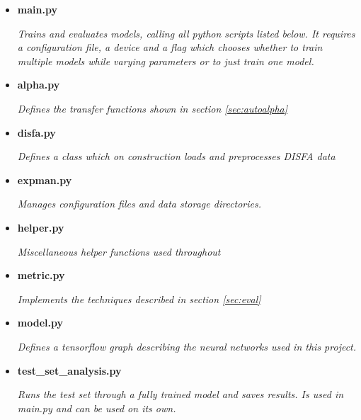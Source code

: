 {\begin{itemize}
\begin{itemize}
                  \begin{sloppypar} \textit{Used by viewResult.ipynb and compareResults.ipynb to open an existing experiment, plot it's results and load it's results.}\end{sloppypar}
                  \item {\bf main.py }
                  \begin{sloppypar} \textit{Trains and evaluates models, calling all python scripts listed below. It requires a configuration file, a device and a flag which chooses whether to train multiple models while varying parameters or to just train one model.}\end{sloppypar}
                  \item {\bf alpha.py }
                  \begin{sloppypar} \textit{Defines the transfer functions shown in section \ref{sec:autoalpha} }\end{sloppypar}
                  \item {\bf disfa.py }
                  \begin{sloppypar} \textit{Defines a class which on construction loads and preprocesses DISFA data}\end{sloppypar}
                  \item {\bf expman.py }
                  \begin{sloppypar} \textit{Manages configuration files and data storage directories.}\end{sloppypar}
                  \item {\bf helper.py }
                  \begin{sloppypar} \textit{Miscellaneous helper functions used throughout}\end{sloppypar}
                  \item {\bf metric.py }
                  \begin{sloppypar} \textit{Implements the techniques described in section \ref{sec:eval} }\end{sloppypar}
                  \item {\bf model.py }
                  \begin{sloppypar} \textit{Defines a tensorflow graph describing the neural networks used in this project.}\end{sloppypar}
                  \item {\bf test\_set\_analysis.py }
                  \begin{sloppypar} \textit{Runs the test set through a fully trained model and saves results. Is used in main.py and can be used on its own.}\end{sloppypar}

\end{itemize}
\end{itemize}}
